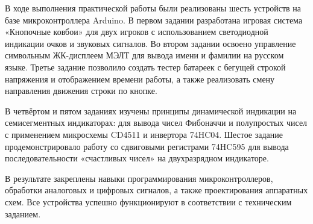 \documentclass[oneside,a4paper,14pt]{extarticle} %
\begin{document}
	В ходе выполнения практической работы были реализованы шесть устройств на базе микроконтроллера Arduino.
	В первом задании разработана игровая система «Кнопочные ковбои» для двух игроков
	с использованием светодиодной индикации очков и звуковых сигналов.
	Во втором задании освоено управление символьным ЖК-дисплеем МЭЛТ для вывода имени и фамилии на русском языке.
	Третье задание позволило создать тестер батареек с бегущей строкой напряжения и отображением времени работы,
	а также реализовать смену направления движения строки по кнопке.

	В четвёртом и пятом заданиях изучены принципы динамической индикации на семисегментных индикаторах:
	для вывода чисел Фибоначчи и полупростых чисел с применением микросхемы CD4511 и инвертора 74HC04.
	Шестое задание продемонстрировало работу со сдвиговыми регистрами 74HC595
	для вывода последовательности «счастливых чисел» на двухразрядном индикаторе.

	В результате закреплены навыки программирования микроконтроллеров,
	обработки аналоговых и цифровых сигналов,
	а также проектирования аппаратных схем.
	Все устройства успешно функционируют в соответствии с техническим заданием.
\end{document}
